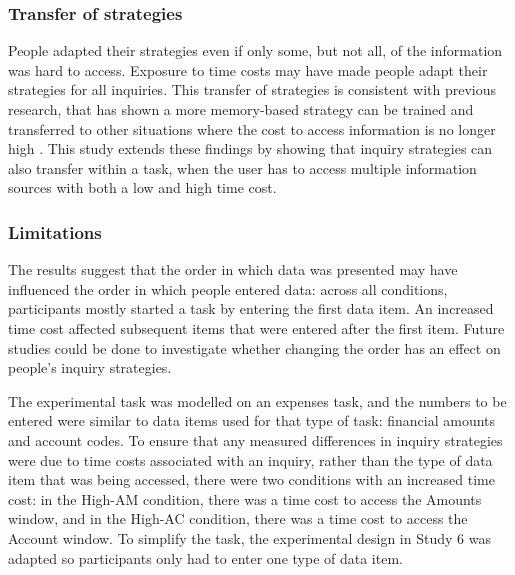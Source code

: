 \subsubsection{Transfer of strategies}
People adapted their strategies even if only some, but not all, of the information was hard to access. Exposure to time costs may have made people adapt their strategies for all inquiries. This transfer of strategies is consistent with previous research, that has shown a more memory-based strategy can be trained and transferred to other situations where the cost to access information is no longer high \citep{Patrick2014}. This study extends these findings by showing that inquiry strategies can also transfer within a task, when the user has to access multiple information sources with both a low and high time cost.

\subsubsection{Limitations}

The results suggest that the order in which data was presented may have influenced the order in which people entered data: across all conditions, participants mostly started a task by entering the first data item. An increased time cost affected subsequent items that were entered after the first item. Future studies could be done to investigate whether changing the order has an effect on people's inquiry strategies.

The experimental task was modelled on an expenses task, and the numbers to be entered were similar to data items used for that type of task: financial amounts and account codes. To ensure that any measured differences in inquiry strategies were due to time costs associated with an inquiry, rather than the type of data item that was being accessed, there were two conditions with an increased time cost: in the High-AM condition, there was a time cost to access the Amounts window, and in the High-AC condition, there was a time cost to access the Account window. To simplify the task, the experimental design in Study 6 was adapted so participants only had to enter one type of data item. 


